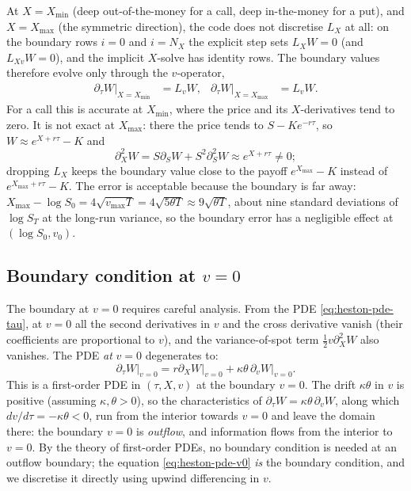 \documentclass[11pt]{article}
\theoremstyle{plain}
\theoremstyle{definition}
\theoremstyle{remark}
\begin{document}
At $X = X_{\min}$ (deep out-of-the-money for a call, deep in-the-money for a put), and $X = X_{\max}$ (the symmetric direction), the code does not discretise $L_X$ at all: on the boundary rows $i = 0$ and $i = N_X$ the explicit step sets $L_X W = 0$ (and $L_{Xv} W = 0$), and the implicit $X$-solve has identity rows. The boundary values therefore evolve only through the $v$-operator,
\begin{align*}
    \partial_\tau W \bigr|_{X = X_{\min}} &= L_v W, & \partial_\tau W \bigr|_{X = X_{\max}} &= L_v W.
\end{align*}
For a call this is accurate at $X_{\min}$, where the price and its $X$-derivatives tend to zero. It is not exact at $X_{\max}$: there the price tends to $S - K e^{-r\tau}$, so $W \approx e^{X + r\tau} - K$ and
\[
    \partial^2_X W = S \partial_S W + S^2 \partial^2_S W \approx e^{X + r\tau} \neq 0;
\]
dropping $L_X$ keeps the boundary value close to the payoff $e^{X_{\max}} - K$ instead of $e^{X_{\max} + r\tau} - K$. The error is acceptable because the boundary is far away: $X_{\max} - \log S_0 = 4\sqrt{v_{\max} T} = 4\sqrt{5\theta T} \approx 9 \sqrt{\theta T}$, about nine standard deviations of $\log S_T$ at the long-run variance, so the boundary error has a negligible effect at $(\log S_0, v_0)$.

\subsection{Boundary condition at $v = 0$}

The boundary at $v = 0$ requires careful analysis. From the PDE \eqref{eq:heston-pde-tau}, at $v = 0$ all the second derivatives in $v$ and the cross derivative vanish (their coefficients are proportional to $v$), and the variance-of-spot term $\tfrac12 v \partial^2_X W$ also vanishes. The PDE \emph{at} $v = 0$ degenerates to:
\begin{equation}
    \partial_\tau W \bigr|_{v=0} = r \partial_X W \bigr|_{v=0} + \kappa\theta\, \partial_v W \bigr|_{v=0}.                                                                                                              \label{eq:heston-pde-v0}
\end{equation}
This is a first-order PDE in $(\tau, X, v)$ at the boundary $v = 0$. The drift $\kappa \theta$ in $v$ is positive (assuming $\kappa, \theta > 0$), so the characteristics of $\partial_\tau W = \kappa\theta\, \partial_v W$, along which $dv/d\tau = -\kappa\theta < 0$, run from the interior towards $v = 0$ and leave the domain there: the boundary $v = 0$ is \emph{outflow}, and information flows from the interior to $v = 0$. By the theory of first-order PDEs, no boundary condition is needed at an outflow boundary; the equation \eqref{eq:heston-pde-v0} \emph{is} the boundary condition, and we discretise it directly using upwind differencing in $v$.
\end{document}
